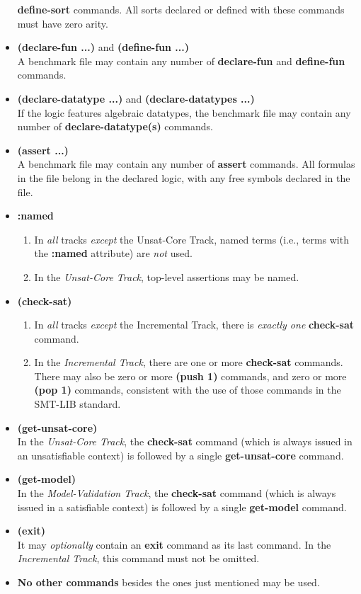 \documentclass[12pt]{article}
\newcommand{\akey}[1]{\textbf{#1}\xspace}
\newcommand{\bkey}[1]{\textbf{{#1}}\xspace}
\newcommand{\inctrack}{Incremental Track\xspace}
\newcommand{\ucoretrack}{Unsat-Core Track\xspace}
\newcommand{\mvaltrack}{Model-Validation Track\xspace}
\begin{document}
\begin{itemize}
    \akey{define-sort} commands.  All sorts declared or defined with these
    commands must have zero arity.
  \item \bkey{(declare-fun ...)} and \bkey{(define-fun ...)}\\
    A benchmark file may contain any number of \akey{declare-fun} and
    \akey{define-fun} commands.
  \item \bkey{(declare-datatype ...)} and \bkey{(declare-datatypes ...)}\\
    If the logic features algebraic datatypes, the benchmark file may
    contain any number of \akey{declare-datatype(s)} commands.
  \item \bkey{(assert ...)}\\
    A benchmark file may contain any number of \akey{assert} commands.  All
    formulas in the file belong in the declared logic, with any free symbols
    declared in the file.
  \item
    \bkey{:named}
    \begin{enumerate}[label=(\alph*)]
      \vspace{-1ex}
      \item In \emph{all} tracks \emph{except} the \ucoretrack,  named
        terms (i.e., terms with the \akey{:named} attribute) are \emph{not}
        used.
      \item In the \emph{\ucoretrack}, top-level assertions may be named.
    \end{enumerate}
    \item
      \bkey{(check-sat)}
      \begin{enumerate}[label=(\alph*)]
        \vspace{-1ex}
        \item In \emph{all} tracks \emph{except} the \inctrack, there is
          \emph{exactly one} \akey{check-sat} command.
        \item In the \emph{\inctrack}, there are one or more
        \akey{check-sat} commands.  There may also be zero or more
        \akey{(push 1)} commands, and zero or more \akey{(pop 1)} commands,
        consistent with the use of those commands in the SMT-LIB standard.
    \end{enumerate}
    \item \bkey{(get-unsat-core)}\\
      In the \emph{\ucoretrack}, the \akey{check-sat} command (which is
      always issued in an unsatisfiable context) is followed by a single
      \akey{get-unsat-core} command.
    \item \bkey{(get-model)}\\
      In the \emph{\mvaltrack}, the \akey{check-sat} command (which is
      always issued in a satisfiable context) is followed by a single
    \akey{get-model} command.
  \item \bkey{(exit)}\\
    It may \emph{optionally} contain an \akey{exit} command as its
    last command.  In the \emph{\inctrack}, this command must not be
    omitted.
  \item \textbf{No other commands} besides the ones just mentioned may be used.
\end{itemize}
\end{document}
